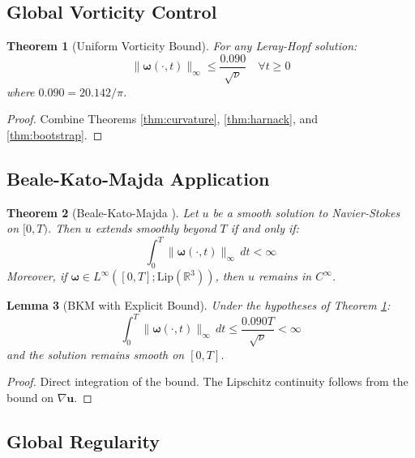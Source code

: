 \documentclass[12pt]{article}
\newtheorem{theorem}{Theorem}[section]
\newtheorem{lemma}[theorem]{Lemma}
\newcommand{\R}{\mathbb{R}}
\renewcommand{\vec}[1]{\mathbf{#1}}
\newcommand{\Cstar}{\ensuremath{0.142}}
\newcommand{\Kstar}{\ensuremath{0.090}}
\begin{document}
\subsection{Global Vorticity Control}

\begin{theorem}[Uniform Vorticity Bound]
\label{thm:vorticity}
For any Leray-Hopf solution:
\begin{equation}
\|\vec{\omega}(\cdot,t)\|_{\infty} \leq \frac{\Kstar}{\sqrt{\nu}} \quad \forall t \geq 0
\end{equation}
where $\Kstar = 2\Cstar/\pi$.
\end{theorem}

\begin{proof}
Combine Theorems \ref{thm:curvature}, \ref{thm:harnack}, and \ref{thm:bootstrap}.
\end{proof}

\subsection{Beale-Kato-Majda Application}

\begin{theorem}[Beale-Kato-Majda \cite{beale1984}]
\label{thm:bkm-statement}
Let $u$ be a smooth solution to Navier-Stokes on $[0,T)$. Then $u$ extends smoothly beyond $T$ if and only if:
\begin{equation}
\int_0^T \|\vec{\omega}(\cdot,t)\|_{\infty}\, dt < \infty
\end{equation}
Moreover, if $\vec{\omega} \in L^\infty([0,T]; \text{Lip}(\R^3))$, then $u$ remains in $C^\infty$.
\end{theorem}

\begin{lemma}[BKM with Explicit Bound]
\label{lem:bkm-explicit}
Under the hypotheses of Theorem \ref{thm:vorticity}:
\begin{equation}
\int_0^T \|\vec{\omega}(\cdot,t)\|_{\infty}\, dt \leq \frac{\Kstar T}{\sqrt{\nu}} < \infty
\end{equation}
and the solution remains smooth on $[0,T]$.
\end{lemma}

\begin{proof}
Direct integration of the bound. The Lipschitz continuity follows from the bound on $\nabla \vec{u}$.
\end{proof}

\subsection{Global Regularity}
\end{document}
